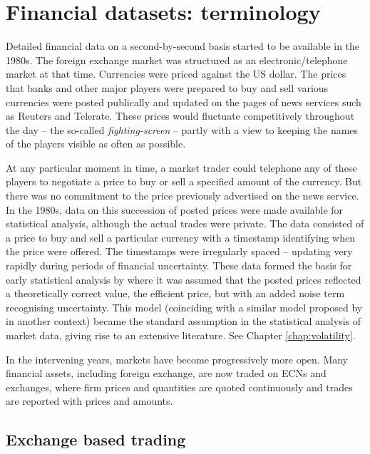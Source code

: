 \section{Financial datasets: terminology}
Detailed financial data on a second-by-second basis started to be available in the 1980s.  The foreign exchange market was structured as an electronic/telephone market at that time. Currencies were priced against the US dollar.  The prices that banks and other major players were prepared to buy and sell various currencies were posted publically and updated on the pages of news services such as Reuters and Telerate. These prices would fluctuate competitively throughout the day -- the so-called {\em fighting-screen} -- partly with a view to keeping the names of the players visible as often as possible.  

At any particular moment in time, a market trader could telephone any of these players to negotiate a price to buy or sell a specified amount of the currency. But there was no commitment to the price previously advertised on the news service. In the 1980s, data on this succession of posted prices were made available for statistical analysis, although the actual trades were private. The data consisted of a price to buy and sell a particular currency with a timestamp identifying when the price were offered. The timestamps were irregularly spaced -- updating very rapidly during periods of financial uncertainty.  These data formed the basis for early statistical analysis by \citet{zhou1996high} where it was assumed that the posted prices reflected a theoretically correct value, the efficient price, but with an added noise term recognising uncertainty.  This model (coinciding with a similar model proposed by \citet{roll1984simple} in another context) became the standard assumption in the statistical analysis of market data, giving rise to an extensive literature. See Chapter \ref{chap:volatility}. 

In the intervening years, markets have become progressively more open. Many financial assets, including foreign exchange, are now traded on ECNs and exchanges, where firm prices and quantities are quoted continuously and trades are reported with prices and amounts.           

\subsection{Exchange based trading}

